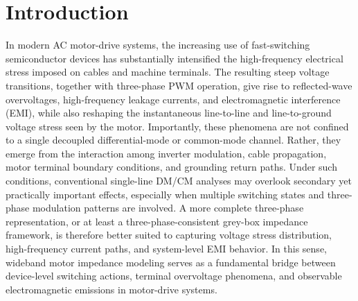 \documentclass[12pt,a4paper]{article}
\begin{document}
\clearpage

{
\tableofcontents
}
\clearpage

\listoffigures
\clearpage

\listoftables
\clearpage


\section{Introduction}

In modern AC motor-drive systems, the increasing use of fast-switching semiconductor devices has substantially intensified the high-frequency electrical stress imposed on cables and machine terminals. The resulting steep voltage transitions, together with three-phase PWM operation, give rise to reflected-wave overvoltages, high-frequency leakage currents, and electromagnetic interference (EMI), while also reshaping the instantaneous line-to-line and line-to-ground voltage stress seen by the motor. Importantly, these phenomena are not confined to a single decoupled differential-mode or common-mode channel. Rather, they emerge from the interaction among inverter modulation, cable propagation, motor terminal boundary conditions, and grounding return paths. Under such conditions, conventional single-line DM/CM analyses may overlook secondary yet practically important effects, especially when multiple switching states and three-phase modulation patterns are involved. A more complete three-phase representation, or at least a three-phase-consistent grey-box impedance framework, is therefore better suited to capturing voltage stress distribution, high-frequency current paths, and system-level EMI behavior\cite{ref3,ref8,ref16,ref20,ref21,ref24,ref29,ref32,ref45}. In this sense, wideband motor impedance modeling serves as a fundamental bridge between device-level switching actions, terminal overvoltage phenomena, and observable electromagnetic emissions in motor-drive systems.
\end{document}
